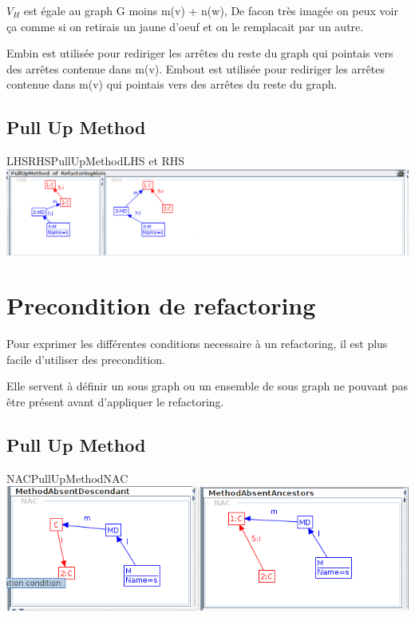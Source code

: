 \documentclass[a4paper, 12pt]{article}
\begin{document}
{$V_H$} est égale au graph G moins m(v) + n(w), De facon très imagée on peux voir ça comme si on retirais un jaune d'oeuf et on le remplacait par un autre.

Embin est utilisée pour rediriger les arrêtes du reste du graph qui pointais vers des arrêtes contenue dans m(v).
Embout est utilisée pour rediriger les arrêtes contenue dans m(v) qui pointais vers des arrêtes du reste du graph.


\subsection{Pull Up Method}

\begin{myfig}{LHSRHSPullUpMethod}{LHS et RHS}
\includegraphics[width=\textwidth]{LHSRHSPullUpMethod.png}
\end{myfig}

\section{Precondition de refactoring}
Pour exprimer les différentes conditions necessaire à un refactoring, il est plus facile d'utiliser des precondition.

Elle servent à définir un sous graph ou un ensemble de sous graph ne pouvant pas être présent avant d'appliquer le refactoring.

\subsection{Pull Up Method}

\begin{myfig}{NACPullUpMethod}{NAC}
\includegraphics[width=\textwidth]{NACPullUpMethod.png}
\end{myfig}
\end{document}
